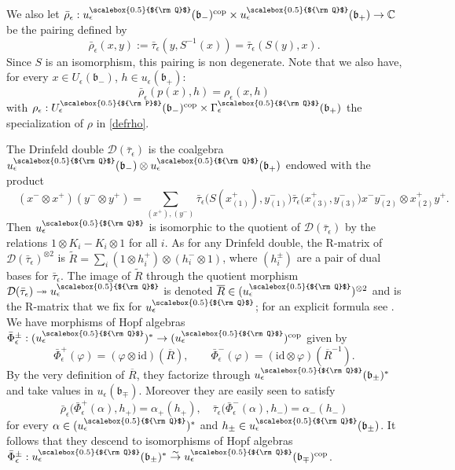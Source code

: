\documentclass[11pt]{amsart}
\newcommand{\e}{\epsilon}
\newcommand{\mc}{\mathbb{C}}
\newcommand{\Q}{{\scalebox{0.5}{${\rm Q}$}}}
\newcommand{\Pup}{{\scalebox{0.5}{${\rm P}$}}}
\begin{document}
\noindent We also let $\bar{\rho}_{\e} : u_\e^\Q(\mathfrak{b}_-)^{\rm cop}\times u_\e^\Q(\mathfrak{b}_+)\to \mc$ be the pairing defined by $$\bar{\rho}_{\e}(x,y) := \bar{\tau}_{\e}(y,S^{-1}(x)) = \bar{\tau}_{\e}(S(y),x).$$
Since $S$ is an isomorphism, this pairing is non degenerate. Note that we also have, for every $x\in U_\e(\mathfrak{b}_-)$, $h\in u_\e(\mathfrak{b}_+)$:
\begin{equation}\label{relrhobar}
\bar{\rho}_{\e}(p(x),h)  = \rho_{\e}(x,h)
\end{equation}
with $\rho_\e : U_\e^\Pup(\mathfrak{b}_-)^{\rm cop} \times \Gamma_\e^\Q(\mathfrak{b}_+)$ the specialization of $\rho$ in \eqref{defrho}.
\smallskip

The Drinfeld double $\mathcal{D}(\bar{\tau}_\e)$ is the coalgebra $u_\e^\Q(\mathfrak{b}_-) \otimes u_\e^\Q(\mathfrak{b}_+)$ endowed with the product 
\begin{equation}\label{DrinfeldDoubleRel}
\quad (x^- \otimes x^+)(y^- \otimes y^+) = \sum_{(x^+),(y^-)} \bar\tau_\e\bigl( S(x^+_{(1)}), y^-_{(1)} \bigr) \bar\tau_\e\bigl( x^+_{(3)}, y^-_{(3)} \bigr)x^-y^-_{(2)} \otimes x^+_{(2)}y^+.
\end{equation}
Then $u_\e^\Q$ is isomorphic to the quotient of $\mathcal{D}(\bar{\tau}_\e)$ by the relations $1 \otimes K_i - K_i \otimes 1$ for all $i$. As for any Drinfeld double, the R-matrix of $\mathcal{D}(\bar{\tau}_\e)^{\otimes 2}$ is $\widetilde{R} = \textstyle \sum_i (1 \otimes h^+_i) \otimes (h_i^- \otimes 1)$, where $(h_i^\pm)$ are a pair of dual bases for $\bar{\tau}_\e$. The image of $\widetilde{R}$ through the quotient morphism $\mathcal{D}(\bar{\tau}_\e) \twoheadrightarrow u_\e^\Q$ is denoted $\overline{R} \in (u_\e^\Q)^{\otimes 2}$ and is the R-matrix that we fix for $u_\e^\Q$; for an explicit formula see \cite[App.\,A]{Lyub95}. We have morphisms of Hopf algebras $\bar \Phi^\pm_\e : (u_\e^\Q)^* \to (u_\e^\Q)^{\rm cop}$ given by
\begin{equation}\label{PhiPmeSmall}
\bar \Phi^+_\e(\varphi) = (\varphi \otimes \mathrm{id})(\overline{R}), \qquad \bar \Phi_\e^-(\varphi) = (\mathrm{id} \otimes \varphi)(\overline{R}^{-1}).
\end{equation}
By the very definition of $\overline{R}$, they factorize through $u_\e^\Q(\mathfrak{b}_\pm)^*$ and take values in $u_\e(\mathfrak{b}_\mp)$. Moreover they are easily seen to satisfy
\begin{equation}\label{wellnowndualityR}
\bar{\rho}_{\e}\bigl(\bar\Phi_\e^+(\alpha), h_+\bigr) = \alpha_+(h_+), \quad  \bar{\tau}_{\e}\bigl(\bar\Phi_\e^{-}(\alpha), h_-\bigr) = \alpha_-(h_-)
\end{equation}
for every $\alpha\in (u_\e^\Q)^*$ and $h_\pm\in u_\e^\Q(\mathfrak{b}_\pm)$. It follows that they descend to isomorphisms of Hopf algebras $\bar{\Phi}^\pm_\e : u_\e^\Q(\mathfrak{b}_\pm)^* \overset{\sim}{\to} u_\e^\Q(\mathfrak{b}_\mp)^{\rm cop}$.
\end{document}
